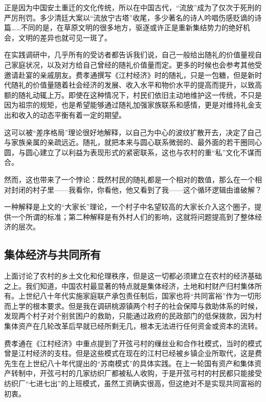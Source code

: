 \documentclass[openany,scheme = chinese, linespread = 1.5]{ctexbook}
\begin{document}
正是因为中国安土重迁的文化传统，所以在中国古代，“流放”成为了仅次于死刑的严厉刑罚。多少清廷大案以“流放宁古塔”收尾，多少著名的诗人吟唱伤感贬谪的诗篇……不同的是，在草原文明的很多地方，驱逐或许正是重新集结势力的绝好机会，文明的差异也就可见一斑了。

在实践调研中，几乎所有的受访者都告诉我们说，自己一般给出随礼的价值量视自己家庭状况，以及对方给自己曾经的随礼价值量而定。更多的时候也会参考其他受邀请赴宴的亲戚朋友。费孝通撰写《江村经济》时的随礼，只是一包糖，但是新时代随礼的价值量随着社会经济的发展、收入水平和物价水平的提高而提升，以致高额的随礼动辄上万。即使在这种情况下，村民们依旧主动地维护这一传统，不只是因为祖宗的规矩，也是希望能够通过随礼加强家族联系和感情，更是对维持礼金支出和收入的动态平衡有着一定的期望。

这可以被“差序格局”理论很好地解释，以自己为中心的波纹扩散开去，决定了自己与家族亲属的亲疏远近。随礼，就把本来与圆心联系微弱的、最外面的若干圈同心圆，与圆心建立了以利益为表现形式的紧密联系，这也与农村的重“私”文化不谋而合。

然而，这也带来了一个悖论：既然村民的随礼都是一个相对的数值，那么在一个相对封闭的村子里——我看你，你看他，他又看到了我——这个循环逻辑由谁破解？

一种解释是上文的“大家长”理论，一个村子中名望较高的大家长介入这个圈子，提供一个所谓的标准；第二种解释是有外村人们的影响，这就将问题提高到了整体经济的层次。

\subsection*{集体经济与共同所有}

上面讨论了农村的乡土文化和伦理秩序，但是这一切都必须建立在农村的经济基础之上。我们知道，中国农村最显著的特点就是集体经济，土地和村财产归村集体所有。上世纪八十年代实施家庭联产承包责任制后，国家也将“共同富裕”作为一切形而上学的根本要求。但是我在调研桃源镇两个村子的社会保障与救助体系的时候，发现两个村子对个别贫困户的救助，只能通过政府的民政部门的低保拨款，因为村集体资产在几轮改革后早就已经所剩无几，根本无法进行任何资金或资本的流转。

费孝通在《江村经济》中重点提到了开弦弓村的缫丝业和合作社模式，当时的模式曾是江村经济的支柱。但是这些模式在现在的江村已经被乡镇企业所取代，这是费先生在上世纪八十年代提出的“苏南模式”的具体实践。在上一轮国有资产和集体资产转制中，开弦弓村的几家纺织厂都被私人收购，于是开弦弓村的村民都只能接受纺织厂“七进七出”的上班模式，虽然工资确实很高，但这绝对不是实现共同富裕的初衷。
\end{document}

